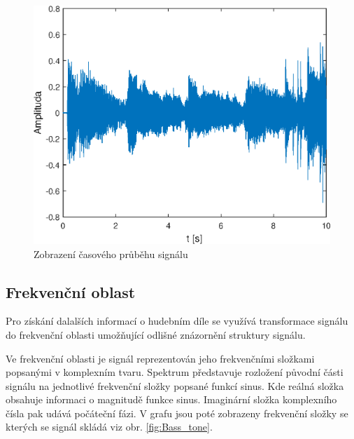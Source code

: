   \begin{figure}[H]
    \centering
    \includegraphics[width = 0.8\linewidth]{obrazky/Waveform.eps}
    \caption{Zobrazení časového průběhu signálu}
    \label{fig:Waveform}
  \end{figure}
  
  \subsection{Frekvenční oblast} \label{sec:FT}
  Pro získání dalalších informací o hudebním díle se využívá transformace signálu do frekvenční oblasti umožňující odlišné znázornění struktury signálu.

  Ve frekvenční oblasti je signál reprezentován jeho frekvenčními složkami popsanými v komplexním tvaru.
  Spektrum představuje rozložení původní části signálu na jednotlivé frekvenční složky popsané funkcí sinus. Kde reálná složka obsahuje informaci o magnitudě  funkce sinus.
  Imaginární složka komplexního čísla pak udává počáteční fázi.
  V grafu jsou poté zobrazeny frekvenční složky se kterých se signál skládá viz obr. \ref{fig:Bass_tone}.



